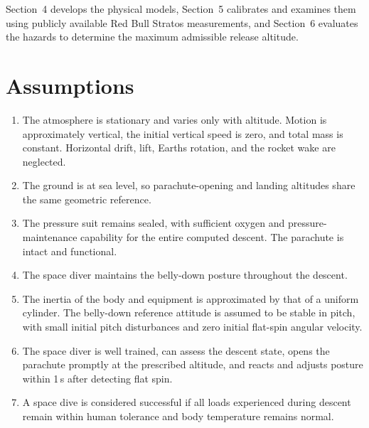 \documentclass[12pt,a4paper]{article}
\numberwithin{equation}{section}
\begin{document}
Section~4 develops the physical models, Section~5 calibrates and examines them using publicly available Red Bull Stratos measurements, and Section~6 evaluates the hazards to determine the maximum admissible release altitude.
\section{Assumptions}
\begin{enumerate}
\item The atmosphere is stationary and varies only with altitude. Motion is approximately vertical, the initial vertical speed is zero, and total mass is constant. Horizontal drift, lift, Earth\textquotesingle s rotation, and the rocket wake are neglected.
\item The ground is at sea level, so parachute-opening and landing altitudes share the same geometric reference.
\item The pressure suit remains sealed, with sufficient oxygen and pressure-maintenance capability for the entire computed descent. The parachute is intact and functional.
\item The space diver maintains the belly-down posture throughout the descent.
\item The inertia of the body and equipment is approximated by that of a uniform cylinder. The belly-down reference attitude is assumed to be stable in pitch, with small initial pitch disturbances and zero initial flat-spin angular velocity.
\item The space diver is well trained, can assess the descent state, opens the parachute promptly at the prescribed altitude, and reacts and adjusts posture within 1\,s after detecting flat spin.
\item A space dive is considered successful if all loads experienced during descent remain within human tolerance and body temperature remains normal.
\end{enumerate}
\end{document}
